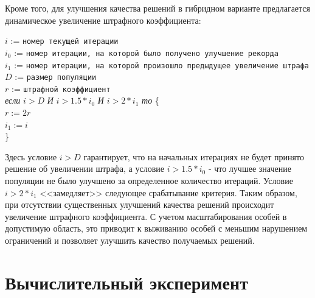 Кроме того, для улучшения качества решений в гибридном варианте предлагается динамическое увеличение штрафного коэффициента:

\begin{flushleft}
\small

$i$ := \verb"номер текущей итерации" \\
$i_0$ := \verb"номер итерации, на которой было получено улучшение рекорда"\\
$i_1$ := \verb"номер итерации, на которой произошло предыдущее увеличение штрафа"\\
$D$ := \verb"размер популяции"\\
$r$ := \verb"штрафной коэффициент"\\

\textit{если} $i > D$ \textit{И} $i > 1.5 * i_0$ \textit{И} $i > 2 * i_1$  \textit{то} \{\\
\leftskip=12pt
    $r := 2r$\\
    $i_1 := i$\\
    \leftskip=0pt
\}
\end{flushleft}

Здесь условие $i > D$ гарантирует, что на начальных итерациях не будет принято решение об увеличении штрафа, а условие $i > 1.5 * i_0$ - что лучшее значение популяции не было улучшено за определенное количество итераций. Условие $i > 2 * i_1$ <<замедляет>> следующее срабатывание критерия.
Таким образом, при отсутствии существенных улучшений качества решений происходит увеличение штрафного коэффициента. С учетом масштабирования особей в допустимую область, это приводит к выживанию особей с меньшим нарушением ограничений и позволяет улучшить качество получаемых решений.

\section{Вычислительный эксперимент}\label{sec:exp:de}

